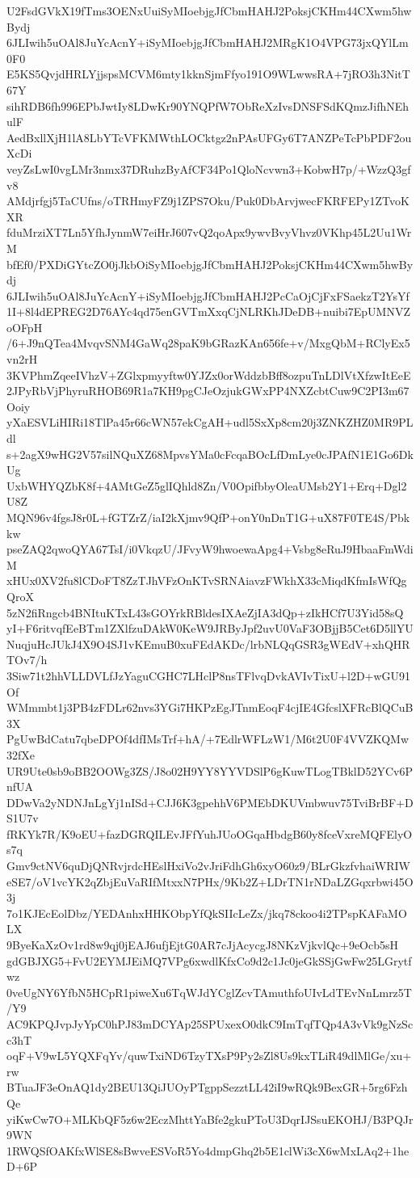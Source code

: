 U2FsdGVkX19fTms3OENxUuiSyMIoebjgJfCbmHAHJ2PoksjCKHm44CXwm5hwBydj
6JLIwih5uOAl8JuYcAcnY+iSyMIoebjgJfCbmHAHJ2MRgK1O4VPG73jxQYlLm0F0
E5KS5QvjdHRLYjjspsMCVM6mty1kknSjmFfyo191O9WLwwsRA+7jRO3h3NitT67Y
sihRDB6fh996EPbJwtIy8LDwKr90YNQPfW7ObReXzIvsDNSFSdKQmzJifhNEhulF
AedBxllXjH1lA8LbYTcVFKMWthLOCktgz2nPAsUFGy6T7ANZPeTcPbPDF2ouXcDi
veyZsLwI0vgLMr3nmx37DRuhzByAfCF34Po1QloNcvwn3+KobwH7p/+WzzQ3gfv8
AMdjrfgj5TaCUfns/oTRHmyFZ9j1ZPS7Oku/Puk0DbArvjwecFKRFEPy1ZTvoKXR
fduMrziXT7Ln5YfhJynmW7eiHrJ607vQ2qoApx9ywvBvyVhvz0VKhp45L2Uu1WrM
bfEf0/PXDiGYtcZO0jJkbOiSyMIoebjgJfCbmHAHJ2PoksjCKHm44CXwm5hwBydj
6JLIwih5uOAl8JuYcAcnY+iSyMIoebjgJfCbmHAHJ2PcCaOjCjFxFSaekzT2YsYf
1I+8l4dEPREG2D76AYc4qd75enGVTmXxqCjNLRKhJDeDB+nuibi7EpUMNVZoOFpH
/6+J9nQTea4MvqvSNM4GaWq28paK9bGRazKAn656fe+v/MxgQbM+RClyEx5vn2rH
3KVPhmZqeeIVhzV+ZGlxpmyyftw0YJZx0orWddzbBff8ozpuTnLDlVtXfzwItEeE
2JPyRbVjPhyruRHOB69R1a7KH9pgCJeOzjukGWxPP4NXZcbtCuw9C2PI3m67Ooiy
yXaESVLiHIRi18TlPa45r66cWN57ekCgAH+udl5SxXp8cm20j3ZNKZHZ0MR9PLdl
s+2agX9wHG2V57silNQuXZ68MpvsYMa0cFcqaBOcLfDmLye0cJPAfN1E1Go6DkUg
UxbWHYQZbK8f+4AMtGeZ5glIQhld8Zn/V0OpifbbyOleaUMsb2Y1+Erq+Dgl2U8Z
MQN96v4fgsJ8r0L+fGTZrZ/iaI2kXjmv9QfP+onY0nDnT1G+uX87F0TE4S/Pbkkw
pseZAQ2qwoQYA67TsI/i0VkqzU/JFvyW9hwoewaApg4+Vsbg8eRuJ9HbaaFmWdiM
xHUx0XV2fu8lCDoFT8ZzTJhVFzOnKTvSRNAiavzFWkhX33cMiqdKfmIsWfQgQroX
5zN2fiRngcb4BNItuKTxL43sGOYrkRBldesIXAeZjIA3dQp+zIkHCf7U3Yid58sQ
yI+F6ritvqfEeBTm1ZXlfzuDAkW0KeW9JRByJpf2uvU0VaF3OBjjB5Cet6D5llYU
NuqjuHcJUkJ4X9O4SJ1vKEmuB0xuFEdAKDc/lrbNLQqGSR3gWEdV+xhQHRTOv7/h
3Siw71t2hhVLLDVLfJzYaguCGHC7LHclP8nsTFlvqDvkAVIvTixU+l2D+wGU91Of
WMmmbt1j3PB4zFDLr62nvs3YGi7HKPzEgJTnmEoqF4cjIE4GfcslXFRcBlQCuB3X
PgUwBdCatu7qbeDPOf4dfIMsTrf+hA/+7EdlrWFLzW1/M6t2U0F4VVZKQMw32fXe
UR9Ute0sb9oBB2OOWg3ZS/J8o02H9YY8YYVDSlP6gKuwTLogTBklD52YCv6PnfUA
DDwVa2yNDNJnLgYj1nISd+CJJ6K3gpehhV6PMEbDKUVmbwuv75TviBrBF+DS1U7v
fRKYk7R/K9oEU+fazDGRQILEvJFfYuhJUoOGqaHbdgB60y8fceVxreMQFElyOs7q
Gmv9ctNV6quDjQNRvjrdcHEslHxiVo2vJriFdhGh6xyO60z9/BLrGkzfvhaiWRIW
eSE7/oV1vcYK2qZbjEuVaRIfMtxxN7PHx/9Kb2Z+LDrTN1rNDaLZGqxrbwi45O3j
7o1KJEcEolDbz/YEDAnhxHHKObpYfQkSIIcLeZx/jkq78ckoo4i2TPspKAFaMOLX
9ByeKaXzOv1rd8w9qj0jEAJ6ufjEjtG0AR7cJjAcycgJ8NKzVjkvlQc+9eOcb5sH
gdGBJXG5+FvU2EYMJEiMQ7VPg6xwdlKfxCo9d2c1Jc0jeGkSSjGwFw25LGrytfwz
0veUgNY6YfbN5HCpR1piweXu6TqWJdYCglZcvTAmuthfoUIvLdTEvNnLmrz5T/Y9
AC9KPQJvpJyYpC0hPJ83mDCYAp25SPUxexO0dkC9ImTqfTQp4A3vVk9gNzScc3hT
oqF+V9wL5YQXFqYv/quwTxiND6TzyTXsP9Py2sZl8Us9kxTLiR49dlMlGe/xu+rw
BTuaJF3eOnAQ1dy2BEU13QiJUOyPTgppSezztLL42iI9wRQk9BexGR+5rg6FzhQe
yiKwCw7O+MLKbQF5z6w2EczMhttYaBfe2gkuPToU3DqrIJSsuEKOHJ/B3PQJr9WN
1RWQSfOAKfxWlSE8sBwveESVoR5Yo4dmpGhq2b5E1clWi3cX6wMxLAq2+1heD+6P
